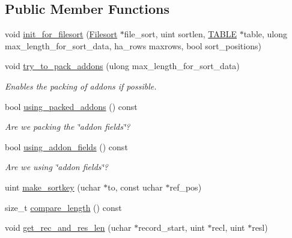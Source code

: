 \subsection*{Public Member Functions}
\begin{DoxyCompactItemize}
\item 
void \mbox{\hyperlink{classSort__param_a1c88fed270d14b04d9430213e2957eab}{init\+\_\+for\+\_\+filesort}} (\mbox{\hyperlink{classFilesort}{Filesort}} $\ast$file\+\_\+sort, uint sortlen, \mbox{\hyperlink{structTABLE}{T\+A\+B\+LE}} $\ast$table, ulong max\+\_\+length\+\_\+for\+\_\+sort\+\_\+data, ha\+\_\+rows maxrows, bool sort\+\_\+positions)
\item 
\mbox{\label{classSort__param_aab3d2a63aed2ceb0fe87f44987db44d5}} 
void \mbox{\hyperlink{classSort__param_aab3d2a63aed2ceb0fe87f44987db44d5}{try\+\_\+to\+\_\+pack\+\_\+addons}} (ulong max\+\_\+length\+\_\+for\+\_\+sort\+\_\+data)
\begin{DoxyCompactList}\small\item\em Enables the packing of addons if possible. \end{DoxyCompactList}\item 
\mbox{\label{classSort__param_a2e7fb1385badc24a53c808d1e7de0099}} 
bool \mbox{\hyperlink{classSort__param_a2e7fb1385badc24a53c808d1e7de0099}{using\+\_\+packed\+\_\+addons}} () const
\begin{DoxyCompactList}\small\item\em Are we packing the \char`\"{}addon fields\char`\"{}? \end{DoxyCompactList}\item 
\mbox{\label{classSort__param_afb3c42f0a3293299ae92677b5d86d07e}} 
bool \mbox{\hyperlink{classSort__param_afb3c42f0a3293299ae92677b5d86d07e}{using\+\_\+addon\+\_\+fields}} () const
\begin{DoxyCompactList}\small\item\em Are we using \char`\"{}addon fields\char`\"{}? \end{DoxyCompactList}\item 
uint \mbox{\hyperlink{classSort__param_af1550d8933ac48ff4f9ac337429b1794}{make\+\_\+sortkey}} (uchar $\ast$to, const uchar $\ast$ref\+\_\+pos)
\item 
size\+\_\+t \mbox{\hyperlink{classSort__param_a6d29e4adf43d2a38309f862d4fe072f9}{compare\+\_\+length}} () const
\item 
void \mbox{\hyperlink{classSort__param_ab163236156a4c13ec6578d7813b50c8e}{get\+\_\+rec\+\_\+and\+\_\+res\+\_\+len}} (uchar $\ast$record\+\_\+start, uint $\ast$recl, uint $\ast$resl)
\end{DoxyCompactItemize}

